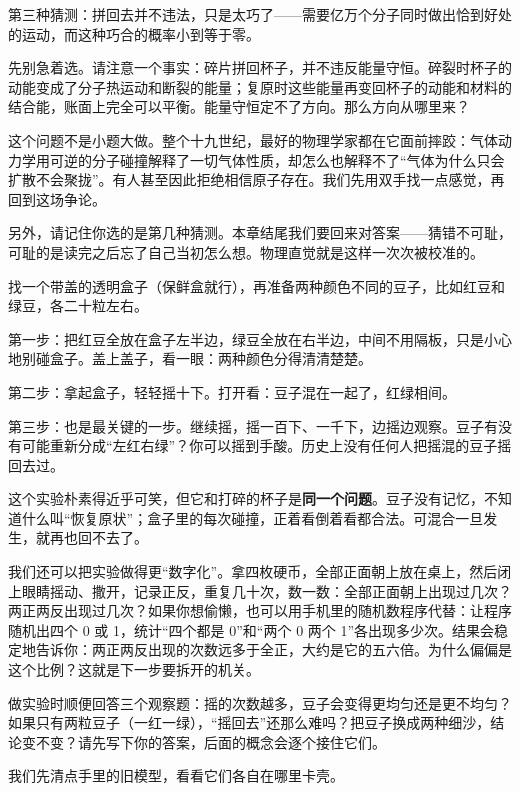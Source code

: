 第三种猜测：拼回去并不违法，只是太巧了——需要亿万个分子同时做出恰到好处的运动，而这种巧合的概率小到等于零。

先别急着选。请注意一个事实：碎片拼回杯子，并不违反能量守恒。碎裂时杯子的动能变成了分子热运动和断裂的能量；复原时这些能量再变回杯子的动能和材料的结合能，账面上完全可以平衡。能量守恒定不了方向。那么方向从哪里来？

这个问题不是小题大做。整个十九世纪，最好的物理学家都在它面前摔跤：气体动力学用可逆的分子碰撞解释了一切气体性质，却怎么也解释不了“气体为什么只会扩散不会聚拢”。有人甚至因此拒绝相信原子存在。我们先用双手找一点感觉，再回到这场争论。

另外，请记住你选的是第几种猜测。本章结尾我们要回来对答案——猜错不可耻，可耻的是读完之后忘了自己当初怎么想。物理直觉就是这样一次次被校准的。


\begin{experiment}[摇不回去的豆子]
找一个带盖的透明盒子（保鲜盒就行），再准备两种颜色不同的豆子，比如红豆和绿豆，各二十粒左右。

第一步：把红豆全放在盒子左半边，绿豆全放在右半边，中间不用隔板，只是小心地别碰盒子。盖上盖子，看一眼：两种颜色分得清清楚楚。

第二步：拿起盒子，轻轻摇十下。打开看：豆子混在一起了，红绿相间。

第三步：也是最关键的一步。继续摇，摇一百下、一千下，边摇边观察。豆子有没有可能重新分成“左红右绿”？你可以摇到手酸。历史上没有任何人把摇混的豆子摇回去过。
\end{experiment}

这个实验朴素得近乎可笑，但它和打碎的杯子是\textbf{同一个问题}。豆子没有记忆，不知道什么叫“恢复原状”；盒子里的每次碰撞，正着看倒着看都合法。可混合一旦发生，就再也回不去了。

我们还可以把实验做得更“数字化”。拿四枚硬币，全部正面朝上放在桌上，然后闭上眼睛摇动、撒开，记录正反，重复几十次，数一数：全部正面朝上出现过几次？两正两反出现过几次？如果你想偷懒，也可以用手机里的随机数程序代替：让程序随机出四个 0 或 1，统计“四个都是 0”和“两个 0 两个 1”各出现多少次。结果会稳定地告诉你：两正两反出现的次数远多于全正，大约是它的五六倍。为什么偏偏是这个比例？这就是下一步要拆开的机关。

做实验时顺便回答三个观察题：摇的次数越多，豆子会变得更均匀还是更不均匀？如果只有两粒豆子（一红一绿），“摇回去”还那么难吗？把豆子换成两种细沙，结论变不变？请先写下你的答案，后面的概念会逐个接住它们。


我们先清点手里的旧模型，看看它们各自在哪里卡壳。

